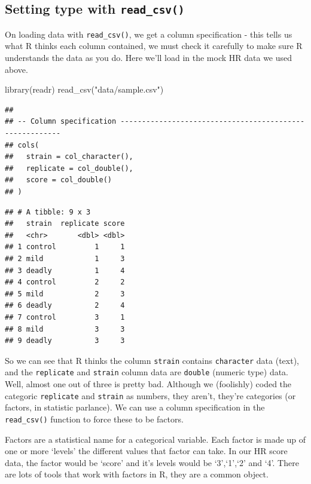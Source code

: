 \documentclass[
]{book}
\newenvironment{Shaded}{\begin{snugshade}}{\end{snugshade}}
\newcommand{\FunctionTok}[1]{\textcolor[rgb]{0.00,0.00,0.00}{#1}}
\newcommand{\NormalTok}[1]{#1}
\newcommand{\StringTok}[1]{\textcolor[rgb]{0.31,0.60,0.02}{#1}}
\newenvironment{sidenote}
{ \begin{tcolorbox}[colbacktitle=blue!50!white,
title=huh?,coltitle=white,
fonttitle=\bfseries] }
{  \end{tcolorbox} }
\begin{document}
\hypertarget{setting-type-with-read_csv}{%
\subsection{\texorpdfstring{Setting type with \texttt{read\_csv()}}{Setting type with read\_csv()}}\label{setting-type-with-read_csv}}

On loading data with \texttt{read\_csv()}, we get a column specification - this tells us what R thinks each column contained, we must check it carefully to make sure R understands the data as you do. Here we'll load in the mock HR data we used above.

\begin{Shaded}
\begin{Highlighting}[]
\FunctionTok{library}\NormalTok{(readr)}
\FunctionTok{read\_csv}\NormalTok{(}\StringTok{"data/sample.csv"}\NormalTok{)}
\end{Highlighting}
\end{Shaded}

\begin{verbatim}
## 
## -- Column specification --------------------------------------------------------
## cols(
##   strain = col_character(),
##   replicate = col_double(),
##   score = col_double()
## )
\end{verbatim}

\begin{verbatim}
## # A tibble: 9 x 3
##   strain  replicate score
##   <chr>       <dbl> <dbl>
## 1 control         1     1
## 2 mild            1     3
## 3 deadly          1     4
## 4 control         2     2
## 5 mild            2     3
## 6 deadly          2     4
## 7 control         3     1
## 8 mild            3     3
## 9 deadly          3     3
\end{verbatim}

So we can see that R thinks the column \texttt{strain} contains \texttt{character} data (text), and the \texttt{replicate} and \texttt{strain} column data are \texttt{double} (numeric type) data. Well, almost one out of three is pretty bad. Although we (foolishly) coded the categoric \texttt{replicate} and \texttt{strain} as numbers, they aren't, they're categories (or factors, in statistic parlance). We can use a column specification in the \texttt{read\_csv()} function to force these to be factors.

\begin{sidenote}
Factors are a statistical name for a categorical variable. Each factor is made up of one or more `levels' the different values that factor can take. In our HR score data, the factor would be `score' and it's levels would be `3',`1',`2' and `4'. There are lots of tools that work with factors in R, they are a common object.
\end{sidenote}
\end{document}

